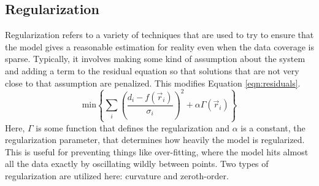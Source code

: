 \documentclass[12pt,letterpaper]{article}
\begin{document}
  \subsection{Regularization}
  Regularization refers to a variety of techniques that are used to try to ensure that the model gives a reasonable estimation for reality even when the data coverage is sparse.  Typically, it involves making some kind of assumption about the system and adding a term to the residual equation so that solutions that are not very close to that assumption are penalized.  This modifies Equation \ref{eqn:residuals}.
  \begin{equation}
    \label{eqn:residualswreg}
    \text{min}\left\{\sum_i\left(\frac{d_i-f(\vec{r}_i)}{\sigma_i}\right)^2+\alpha\Gamma(\vec{r}_i)\right\}
  \end{equation}
  Here, \(\Gamma\) is some function that defines the regularization and \(\alpha\) is a constant, the regularization parameter, that determines how heavily the model is regularized.  This is useful for preventing things like over-fitting, where the model hits almost all the data exactly by oscillating wildly between points.  Two types of regularization are utilized here: curvature and zeroth-order.
\end{document}
